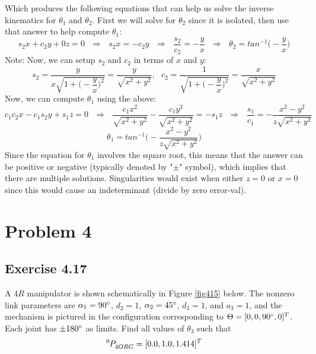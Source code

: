 \documentclass[10pt]{article}
\begin{document}
Which produces the following equations that can help us solve the inverse kinematics for $\theta_{1}$ and $\theta_{2}$.  First we will solve for $\theta_{2}$ since it is isolated, then use that answer to help compute $\theta_{1}$:
\[
s_{2}x      + c_{2}y      + 0z = 0
\mbox{    }\Rightarrow\mbox{    }
s_{2}x = -c_{2}y
\mbox{    }\Rightarrow\mbox{    }
\dfrac{s_{2}}{c_{2}} = -\dfrac{y}{x}
\mbox{    }\Rightarrow\mbox{    }
\theta_{2} = tan^{-1}\bigg(-\dfrac{y}{x}\bigg)
\]
Note: Now, we can setup $s_{2}$ and $c_{2}$ in terms of $x$ and $y$:
\[
s_{2} = \dfrac{y}{x\sqrt{1 + \bigg(-\dfrac{y}{x}\bigg)^2}} =
\dfrac{y}{\sqrt{x^2 + y^2}}, \mbox{     }
c_{2} = \dfrac{1}{\sqrt{1 + \bigg(-\dfrac{y}{x}\bigg)^2}} =
\dfrac{x}{\sqrt{x^2 + y^2}}
\]
Now, we can compute $\theta_{1}$ using the above:
\[
c_{1} c_{2}x  - c_{1} s_{2}y + s_{1}z = 0
\mbox{    }\Rightarrow\mbox{    }
\dfrac{c_{1} x^2}{\sqrt{x^2 + y^2}}  - \dfrac{c_{1}y^2}{\sqrt{x^2 + y^2}} = - s_{1}z
\mbox{    }\Rightarrow\mbox{    }
\dfrac{s_{1}}{c_{1}} = -\dfrac{x^2 - y^2}{z\sqrt{x^2 + y^2}}
\]
\[
\theta_{1} = tan^{-1}\bigg(-\dfrac{x^2 - y^2}{z\sqrt{x^2 + y^2}}\bigg)
\]
Since the equation for $\theta_{1}$ involves the square root, this means that the answer can be positive or negative (typically denoted by "$\pm$" symbol), which implies that there are multiple solutions.  Singularities would exist when either $z = 0$ or $x = 0$ since this would cause an indeterminant (divide by zero error-val). \pagebreak
\section*{Problem 4}
\subsection*{Exercise 4.17}
A $4R$ manipulator is shown schematically in Figure \ref{fig415} below. The nonzero link parameters are $\alpha_{1} = 90\degree$, $d_{2} = 1$, $\alpha_{2} = 45\degree$, $d_{3} = 1$, and $a_{3} = 1$, and the mechanism is pictured in the configuration corresponding to $\Theta = [ 0, 0, 90\degree, 0]^T$. Each joint has $\pm 180\degree $ as limits. Find all values of $\theta_{3}$ such that
\begin{equation*}
\tensor*[^{0}]{P}{_{4ORG}} = [0.0, 1.0, 1.414]^T
\end{equation*}
\end{document}
